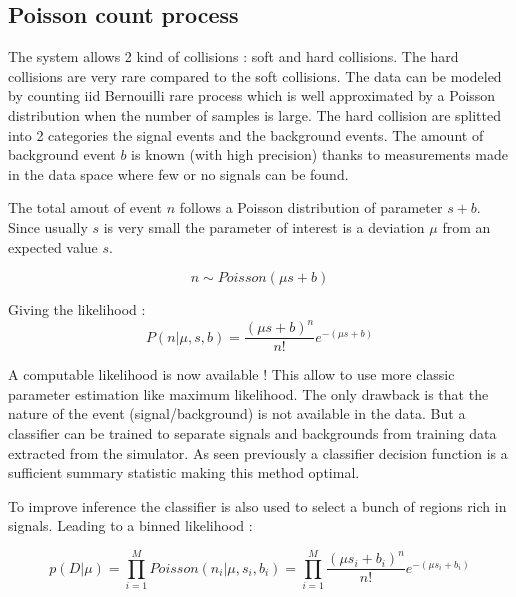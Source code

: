 \subsection{Poisson count process} %
\label{sub:poisson_count_process}

The system allows 2 kind of collisions : soft and hard collisions.
The hard collisions are very rare compared to the soft collisions.
The data can be modeled by counting iid Bernouilli rare process which is well approximated by a Poisson distribution \needcite when the number of samples is large.
The hard collision are splitted into 2 categories the signal events and the background events.
The amount of background event $b$ is known (with high precision) thanks to measurements made in the data space where few or no signals can be found.

The total amout of event $n$ follows a Poisson distribution of parameter $s + b$.
Since usually $s$ is very small the parameter of interest is a deviation $\mu$ from an expected value $s$.

\begin{equation}
	n \sim Poisson(\mu s + b)
\end{equation}

Giving the likelihood :
\begin{equation}
	P(n| \mu, s, b) = \frac{(\mu s +b)^n }{n!} e^{-(\mu s + b)}
\end{equation}

A computable likelihood is now available !
This allow to use more classic parameter estimation like maximum likelihood.
The only drawback is that the nature of the event (signal/background) is not available in the data.
But a classifier can be trained to separate signals and backgrounds from training data extracted from the simulator.
As seen previously a classifier decision function is a sufficient summary statistic making this method optimal.

To improve inference the classifier is also used to select a bunch of regions rich in signals.
Leading to a binned likelihood :

\begin{equation}
	p(D|\mu) = \prod_{i=1}^M Poisson(n_i | \mu, s_i, b_i) = \prod_{i=1}^M \frac{(\mu s_i + b_i)^n }{n!} e^{-(\mu s_i + b_i)}
\end{equation}






